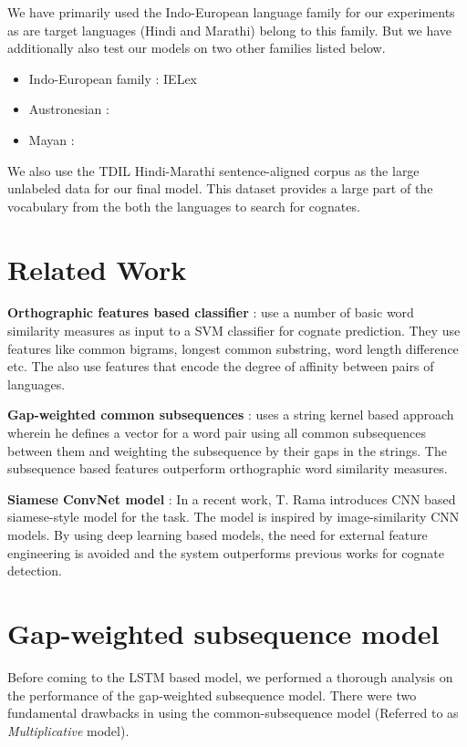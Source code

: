 \documentclass[11pt,letterpaper]{article}
\begin{document}
We have primarily used the Indo-European language family for our experiments as are target languages (Hindi and Marathi) belong to this family. But we have additionally also test our models on two other families listed below.

\begin{itemize}
\item Indo-European family : IELex
\item Austronesian :
\item Mayan :
\end{itemize}

We also use the TDIL Hindi-Marathi sentence-aligned corpus as the large unlabeled data for our final model. This dataset provides a large part of the vocabulary from the both the languages to search for cognates.

\section{Related Work}
\textbf{Orthographic features based classifier} : \citet{hauer2011clustering} use a number of basic word similarity measures as input to a SVM classifier for cognate prediction. They use features like common bigrams, longest common substring, word length difference etc. The also use features that encode the degree of affinity between pairs of languages.

\textbf{Gap-weighted common subsequences} : \citet{rama2015automatic} uses a string kernel based approach wherein he defines a vector for a word pair using all common subsequences between them and weighting the subsequence by their gaps in the strings. The subsequence based features outperform orthographic word similarity measures.

\textbf{Siamese ConvNet model} : In a recent work, T. Rama introduces CNN based siamese-style model \cite{rama2016siamese} for the task. The model is inspired by image-similarity CNN models. By using deep learning based models, the need for external feature engineering is avoided and the system outperforms previous works for cognate detection.

\section{Gap-weighted subsequence model}
Before coming to the LSTM based model, we performed a thorough analysis on the performance of the gap-weighted subsequence model.
There were two fundamental drawbacks in using the common-subsequence model (Referred to as \textit{Multiplicative} model). 
\end{document}
